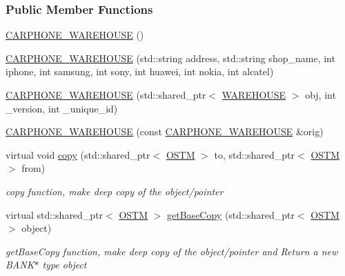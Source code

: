 \subsubsection*{Public Member Functions}
\begin{DoxyCompactItemize}
\item 
\hyperlink{class_c_a_r_p_h_o_n_e___w_a_r_e_h_o_u_s_e_a0acec1e20e236b4debf1e0d26334a868_a0acec1e20e236b4debf1e0d26334a868}{C\+A\+R\+P\+H\+O\+N\+E\+\_\+\+W\+A\+R\+E\+H\+O\+U\+SE} ()
\item 
\hyperlink{class_c_a_r_p_h_o_n_e___w_a_r_e_h_o_u_s_e_a1e61584abd37ed2189143f0c0d4d2e40_a1e61584abd37ed2189143f0c0d4d2e40}{C\+A\+R\+P\+H\+O\+N\+E\+\_\+\+W\+A\+R\+E\+H\+O\+U\+SE} (std\+::string address, std\+::string shop\+\_\+name, int iphone, int samsung, int sony, int huawei, int nokia, int alcatel)
\item 
\hyperlink{class_c_a_r_p_h_o_n_e___w_a_r_e_h_o_u_s_e_a131eb8df5342de81022b166f40f94d92_a131eb8df5342de81022b166f40f94d92}{C\+A\+R\+P\+H\+O\+N\+E\+\_\+\+W\+A\+R\+E\+H\+O\+U\+SE} (std\+::shared\+\_\+ptr$<$ \hyperlink{class_w_a_r_e_h_o_u_s_e}{W\+A\+R\+E\+H\+O\+U\+SE} $>$ obj, int \+\_\+version, int \+\_\+unique\+\_\+id)
\item 
\hyperlink{class_c_a_r_p_h_o_n_e___w_a_r_e_h_o_u_s_e_a7b2446d35d557bdfaa8dbd769f845abb_a7b2446d35d557bdfaa8dbd769f845abb}{C\+A\+R\+P\+H\+O\+N\+E\+\_\+\+W\+A\+R\+E\+H\+O\+U\+SE} (const \hyperlink{class_c_a_r_p_h_o_n_e___w_a_r_e_h_o_u_s_e}{C\+A\+R\+P\+H\+O\+N\+E\+\_\+\+W\+A\+R\+E\+H\+O\+U\+SE} \&orig)
\item 
virtual void \hyperlink{class_c_a_r_p_h_o_n_e___w_a_r_e_h_o_u_s_e_ab9ecf71cd2728f348a5b61df698e054c_ab9ecf71cd2728f348a5b61df698e054c}{copy} (std\+::shared\+\_\+ptr$<$ \hyperlink{class_o_s_t_m}{O\+S\+TM} $>$ to, std\+::shared\+\_\+ptr$<$ \hyperlink{class_o_s_t_m}{O\+S\+TM} $>$ from)
\begin{DoxyCompactList}\small\item\em copy function, make deep copy of the object/pointer \end{DoxyCompactList}\item 
virtual std\+::shared\+\_\+ptr$<$ \hyperlink{class_o_s_t_m}{O\+S\+TM} $>$ \hyperlink{class_c_a_r_p_h_o_n_e___w_a_r_e_h_o_u_s_e_a1d3b2f023c0d6e715416f1e87e7245bb_a1d3b2f023c0d6e715416f1e87e7245bb}{get\+Base\+Copy} (std\+::shared\+\_\+ptr$<$ \hyperlink{class_o_s_t_m}{O\+S\+TM} $>$ object)
\begin{DoxyCompactList}\small\item\em get\+Base\+Copy function, make deep copy of the object/pointer and Return a new B\+A\+N\+K$\ast$ type object \end{DoxyCompactList}\item 

\end{DoxyCompactItemize}
